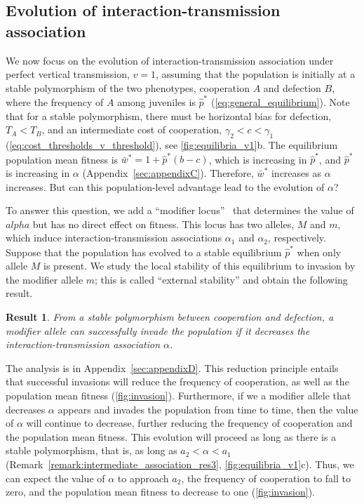 \documentclass[12pt]{extarticle}
\newtheorem{result}{Result}
\begin{document}
\subsection{Evolution of interaction-transmission association} 

We now focus on the evolution of interaction-transmission association under perfect vertical transmission, $v=1$, assuming that the population is initially at a stable polymorphism of the two phenotypes, cooperation $A$ and defection $B$, where the frequency of $A$ among juveniles is $\hat{p}^*$ (\autoref{eq:general_equilibrium}).
Note that for a stable polymorphism, there must be horizontal bias for defection, $T_A < T_B$, and an intermediate cost of cooperation, $\gamma_2 < c < \gamma_1$ (\autoref{eq:cost_thresholds_v_threshold}), see \autoref{fig:equilibria_v1}b.
The equilibrium population mean fitness is $\bar{w}^* = 1 + \hat{p}^*(b-c)$, which is increasing in $\hat{p}^*$, and $\hat{p}^*$ is increasing in $\alpha$ (Appendix~\ref{sec:appendixC}).
Therefore, $\bar{w}^*$ increases as $\alpha$ increases.
But can this population-level advantage lead to the evolution of $\alpha$? 

To answer this question, we add a ``modifier locus''~\citep{Feldman1972,Liberman1986general,Liberman1986modifiers,Liberman1988} that determines the value of $alpha$ but has no direct effect on fitness.
This locus has two alleles, $M$ and $m$, which induce interaction-transmission associations $\alpha_1$ and $\alpha_2$, respectively.
Suppose that the population has evolved to a stable equilibrium $\hat{p}^*$  when only allele $M$ is present.
We study the local stability of this equilibrium to invasion by the modifier allele $m$; this is called ``external stability'' \citep{Liberman1986modifiers,Altenberg2017} and obtain the following result.
\\


\begin{result}%
\label{result:evol_social_association}
From a stable polymorphism between cooperation and defection, a modifier allele can successfully invade the population if it decreases the interaction-transmission association $\alpha$.
\end{result}

The analysis is in Appendix~\ref{sec:appendixD}.
This reduction principle entails that successful invasions will reduce the frequency of cooperation, as well as the population mean fitness (\autoref{fig:invasion}).
Furthermore, if we a modifier allele that decreases $\alpha$ appears and invades the population from time to time, then the value of $\alpha$ will continue to decrease, further reducing the frequency of cooperation and the population mean fitness.
This evolution will proceed as long as there is a stable polymorphism, that is, as long as $a_2 < \alpha < a_1$ (Remark~\ref{remark:intermediate_association_res3}, \autoref{fig:equilibria_v1}c). 
Thus, we can expect the value of $\alpha$ to approach $a_2$, the frequency of cooperation to fall to zero, and the population mean fitness to decrease to one (\autoref{fig:invasion}).
\end{document}
